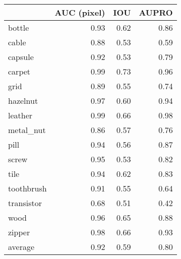 \begin{tabular}{lrrr}
\toprule
{} &  AUC (pixel) &  IOU &  AUPRO \\
\midrule
bottle     &         0.93 & 0.62 &   0.86 \\
cable      &         0.88 & 0.53 &   0.59 \\
capsule    &         0.92 & 0.53 &   0.79 \\
carpet     &         0.99 & 0.73 &   0.96 \\
grid       &         0.89 & 0.55 &   0.74 \\
hazelnut   &         0.97 & 0.60 &   0.94 \\
leather    &         0.99 & 0.66 &   0.98 \\
metal\_nut  &         0.86 & 0.57 &   0.76 \\
pill       &         0.94 & 0.56 &   0.87 \\
screw      &         0.95 & 0.53 &   0.82 \\
tile       &         0.94 & 0.62 &   0.83 \\
toothbrush &         0.91 & 0.55 &   0.64 \\
transistor &         0.68 & 0.51 &   0.42 \\
wood       &         0.96 & 0.65 &   0.88 \\
zipper     &         0.98 & 0.66 &   0.93 \\
average    &         0.92 & 0.59 &   0.80 \\
\bottomrule
\end{tabular}
